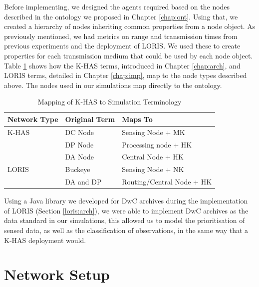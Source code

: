 Before implementing, we designed the agents required based on the nodes described in the ontology we proposed in Chapter \ref{chap:ont}. Using that, we created a hierarchy of nodes inheriting common properties from a node object. As previously mentioned, we had metrics on range and transmission times from previous experiments and the deployment of LORIS. We used these to create properties for each transmission medium that could be used by each node object. Table \ref{sim:tab:terms} shows how the K-HAS terms, introduced in Chapter \ref{chap:arch}, and LORIS terms, detailed in Chapter \ref{chap:imp}, map to the node types described above. The nodes used in our simulations map directly to the ontology.

	\begin{table}[h]
	\centering
	\begin{tabular}{|l|l|l|}
	\hline
	\textbf{Network Type} & \textbf{Original Term} & \textbf{Maps To}          \\
	\hline
	K-HAS                 & DC Node                & Sensing Node + MK         \\
	                      & DP Node                & Processing node + HK         \\
	                      & DA Node                & Central Node + HK         \\
	LORIS                 & Buckeye                & Sensing Node + NK         \\
	                      & DA and DP              & Routing/Central Node + HK \\
	\hline
	\end{tabular}
	\caption{Mapping of K-HAS to Simulation Terminology}
	\label{sim:tab:terms}
	\end{table}

Using a Java library we developed for DwC archives during the implementation of LORIS (Section \ref{loris:arch}), we were able to implement DwC archives as the data standard in our simulations, this allowed us to model the prioritisation of sensed data, as well as the classification of observations, in the same way that a K-HAS deployment would.

\section{Network Setup}\label{sim:setup}

